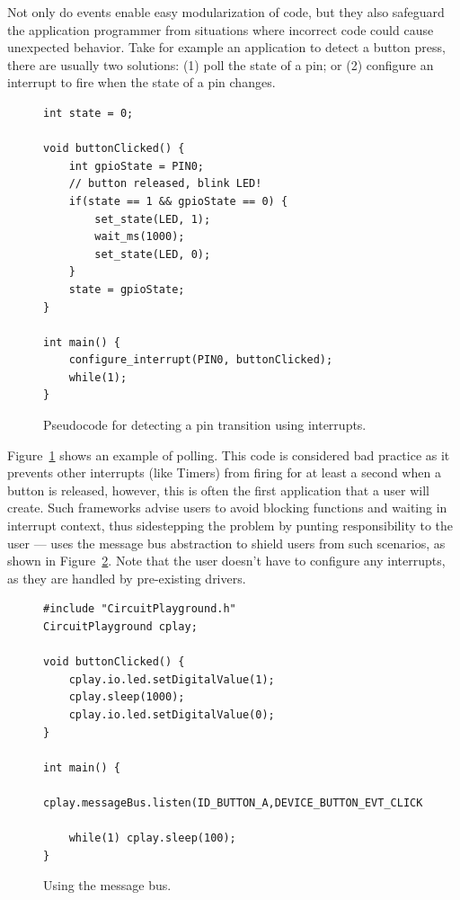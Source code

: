 Not only do events enable easy modularization of code, but they also safeguard the application programmer from situations where incorrect code could cause unexpected behavior. Take for example an application to detect a button press, there are usually two solutions: (1) poll the state of a pin; or (2) configure an interrupt to fire when the state of a pin changes.

\begin{figure}
\begin{lstlisting}
int state = 0;

void buttonClicked() {
    int gpioState = PIN0;
    // button released, blink LED!
    if(state == 1 && gpioState == 0) {
        set_state(LED, 1);
        wait_ms(1000);
        set_state(LED, 0);
    }
    state = gpioState;
}

int main() {
    configure_interrupt(PIN0, buttonClicked);
    while(1);
}
\end{lstlisting}
\caption{\label{fig:pollPin}Pseudocode for detecting a pin transition using interrupts.}
\end{figure}

Figure~\ref{fig:pollPin} shows an example of polling.
This code is considered bad practice as it prevents other interrupts (like Timers) from firing for at least a second when a button is released, however, this is often the first application that a user will create. Such frameworks advise users to avoid blocking functions and waiting in interrupt context, thus sidestepping the problem by punting responsibility to the user --- \CO uses the message bus abstraction to shield users from such scenarios, as shown in Figure~\ref{fig:messageBus}. Note that the user doesn't have to configure any interrupts, as they are handled by pre-existing drivers.

\begin{figure}
\begin{lstlisting}
#include "CircuitPlayground.h"
CircuitPlayground cplay;

void buttonClicked() {
    cplay.io.led.setDigitalValue(1);
    cplay.sleep(1000);
    cplay.io.led.setDigitalValue(0);
}

int main() {
    cplay.messageBus.listen(ID_BUTTON_A,DEVICE_BUTTON_EVT_CLICK,buttonClicked);

    while(1) cplay.sleep(100);
}
\end{lstlisting}
\caption{\label{fig:messageBus}Using the message bus.}
\end{figure}

